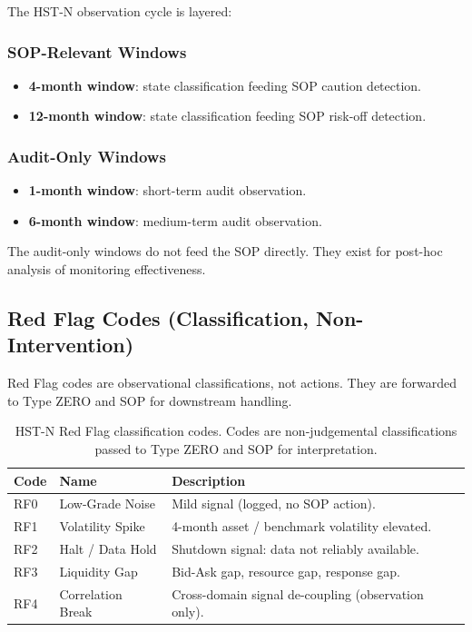 The HST-N observation cycle is layered:

\subsubsection{SOP-Relevant Windows}

\begin{itemize}
\item \textbf{4-month window}: state classification feeding SOP
caution detection.
\item \textbf{12-month window}: state classification feeding SOP
risk-off detection.
\end{itemize}

\subsubsection{Audit-Only Windows}

\begin{itemize}
\item \textbf{1-month window}: short-term audit observation.
\item \textbf{6-month window}: medium-term audit observation.
\end{itemize}

\noindent
The audit-only windows do not feed the SOP directly. They exist for
post-hoc analysis of monitoring effectiveness.

\subsection{Red Flag Codes (Classification, Non-Intervention)}
\label{sec:hstn-v11-red-flag}

Red Flag codes are observational classifications, not actions. They
are forwarded to Type ZERO and SOP for downstream handling.

\clearpage
\begin{table}[ht]
\centering
\small
\begin{tabularx}{\linewidth}{llX}
\toprule
\textbf{Code} & \textbf{Name} & \textbf{Description} \\
\midrule
RF0 & Low-Grade Noise
& Mild signal (logged, no SOP action). \\
RF1 & Volatility Spike
& 4-month asset / benchmark volatility elevated. \\
RF2 & Halt / Data Hold
& Shutdown signal: data not reliably available. \\
RF3 & Liquidity Gap
& Bid-Ask gap, resource gap, response gap. \\
RF4 & Correlation Break
& Cross-domain signal de-coupling (observation only). \\
\bottomrule
\end{tabularx}
\caption[HST-N Red Flag codes]{HST-N Red Flag classification codes.
Codes are non-judgemental classifications passed to Type ZERO and
SOP for interpretation.}
\label{tab:hstn-v11-red-flag}
\end{table}

